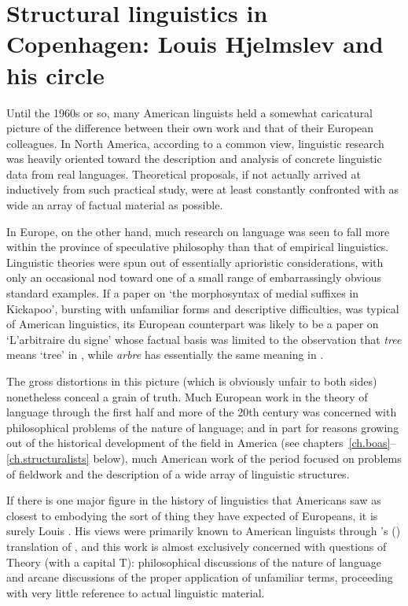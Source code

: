 \chapter{Structural linguistics in Copenhagen: Louis Hjelmslev and his  circle}
\label{ch.hjelmslev}

Until the 1960s or so, many American linguists held a somewhat
caricatural picture of the difference between their own work and that
of their European colleagues. In North America, according to a common
view, linguistic research was heavily oriented toward the description
and analysis of concrete linguistic data from real
languages. Theoretical proposals, if not actually arrived at
inductively from such practical study, were at least constantly
confronted with as wide an array of factual material as possible.

In Europe, on the other hand, much research on language was seen to
fall more within the province of speculative philosophy than that of
empirical linguistics. Linguistic theories were spun out of
essentially aprioristic considerations, with only an occasional nod
toward one of a small range of embarrassingly obvious standard
examples. If a paper on `the morphosyntax of medial suffixes in
Kickapoo', bursting with unfamiliar forms and descriptive
difficulties, was typical of American linguistics, its European
counterpart was likely to be a paper on `L'arbitraire du signe' whose
factual basis was limited to the observation that \emph{tree} means
`tree' in , while \emph{arbre} has essentially the same {meaning}
in .

The gross distortions in this picture (which is obviously unfair to
both sides) nonetheless conceal a grain of truth. Much European work
in the theory of language through the first half and more of the 20th
century was concerned with philosophical problems of the nature of
language; and in part for reasons growing out of the historical
development of the field in America (see
chapters~\ref{ch.boas}--\ref{ch.structuralists} below), much American
work of the period focused on problems of fieldwork and the
description of a wide array of linguistic structures.

If there is one major figure in the history of linguistics that
Americans saw as closest to embodying the sort of thing they have
expected of Europeans, it is surely Louis {\Hjelmslev}. His views were
primarily known to American linguists through 's
(\citeyear{hjelmslev53:osg.whitfield}) translation of
\citealt{hjelmslev43:prolegomena}, and this work is almost exclusively
concerned with questions of Theory (with a capital T): philosophical
discussions of the nature of language and arcane discussions of the
proper application of unfamiliar terms, proceeding with very little
reference to actual linguistic material.

